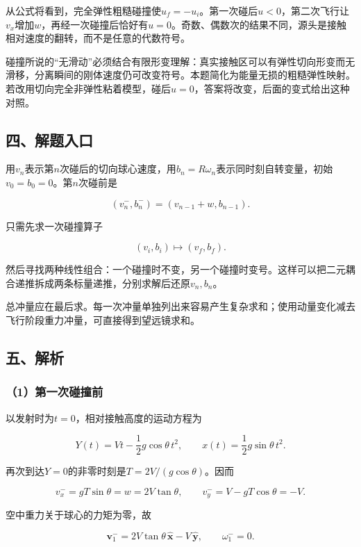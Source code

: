 \documentclass[12pt,a4paper,fontset=fandol]{ctexart}
\begin{document}
从公式将看到，完全弹性粗糙碰撞使\(u_f=-u_i\)。第一次碰后\(u<0\)，第二次飞行让\(v_x\)增加\(w\)，再经一次碰撞后恰好有\(u=0\)。奇数、偶数次的结果不同，源头是接触相对速度的翻转，而不是任意的代数符号。

碰撞所说的``无滑动''必须结合有限形变理解：真实接触区可以有弹性切向形变而无滑移，分离瞬间的刚体速度仍可改变符号。本题简化为能量无损的粗糙弹性映射。若改用切向完全非弹性粘着模型，碰后\(u=0\)，答案将改变，后面的变式给出这种对照。

\subsection{四、解题入口}\label{ux56dbux89e3ux9898ux5165ux53e3-2}

用\(v_n\)表示第\(n\)次碰后的切向球心速度，用\(b_n=R\omega_n\)表示同时刻自转变量，初始\(v_0=b_0=0\)。第\(n\)次碰前是

\[
(v_n^-,b_n^-)=(v_{n-1}+w,b_{n-1}).
\]

只需先求一次碰撞算子

\[
(v_i,b_i)\longmapsto(v_f,b_f).
\]

然后寻找两种线性组合：一个碰撞时不变，另一个碰撞时变号。这样可以把二元耦合递推拆成两条标量递推，分别求解后还原\(v_n,b_n\)。

总冲量应在最后求。每一次冲量单独列出来容易产生复杂求和；使用动量变化减去飞行阶段重力冲量，可直接得到望远镜求和。

\subsection{五、解析}\label{ux4e94ux89e3ux6790-2}

\subsubsection{（1）第一次碰撞前}\label{ux7b2cux4e00ux6b21ux78b0ux649eux524d}

以发射时为\(t=0\)，相对接触高度的运动方程为

\[
Y(t)=Vt-\frac12g\cos\theta\,t^2,
\qquad x(t)=\frac12g\sin\theta\,t^2.
\]

再次到达\(Y=0\)的非零时刻是\(T=2V/(g\cos\theta)\)。因而

\[
v_x^-=gT\sin\theta=w=2V\tan\theta,
\qquad v_y^-=V-gT\cos\theta=-V.
\]

空中重力关于球心的力矩为零，故

\[
\boxed{\boldsymbol v_1^-
=2V\tan\theta\,\hat{\boldsymbol x}
-V\,\hat{\boldsymbol y},\qquad\omega_1^-=0}.
\]
\end{document}
